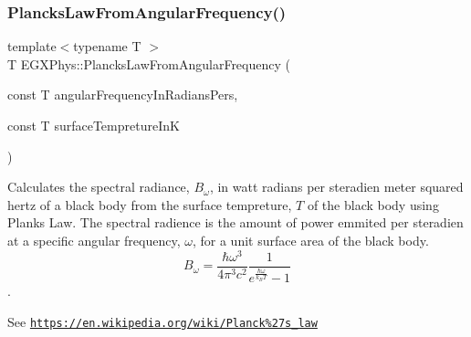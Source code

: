\subsubsection{\texorpdfstring{Plancks\+Law\+From\+Angular\+Frequency()}{PlancksLawFromAngularFrequency()}}
{\footnotesize\ttfamily template$<$typename T $>$ \\
T E\+G\+X\+Phys\+::\+Plancks\+Law\+From\+Angular\+Frequency (\begin{DoxyParamCaption}\item[{const T}]{angular\+Frequency\+In\+Radians\+Pers,  }\item[{const T}]{surface\+Tempreture\+InK }\end{DoxyParamCaption})}



Calculates the spectral radiance, $B_{\omega}$, in watt radians per steradien meter squared hertz of a black body from the surface tempreture, $T$ of the black body using Plank\textquotesingle{}s Law. The spectral radience is the amount of power emmited per steradien at a specific angular frequency, $\omega$, for a unit surface area of the black body. \[ B_{\omega} = \dfrac{\hbar \omega^3}{4\pi^3c^2} \dfrac{1}{e^{\frac{\hbar\omega}{k_B T}} - 1} \]. 

See \href{https://en.wikipedia.org/wiki/Planck%27s_law}{\tt https\+://en.\+wikipedia.\+org/wiki/\+Planck\%27s\+\_\+law}


